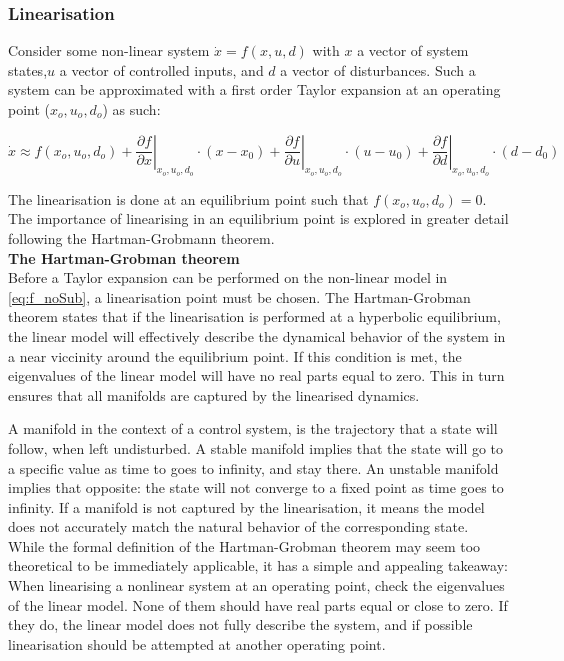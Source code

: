 \subsubsection{Linearisation} \label{sec:mod_linearisation}
Consider some non-linear system $\dot{x} = f(x,u,d)$ with $ x $ a vector of system states,$  u $ a vector of controlled inputs, and $ d $ a vector of disturbances. Such a system can be approximated with a first order Taylor expansion at an operating point ($x_o, u_o, d_o$) as such:

\begin{equation} \label{eq:taylor}
	\dot{x}   \approx   f(x_o, u_o, d_o)   +
	\left. \dfrac{\partial f}{\partial x} \right |_{x_o, u_o, d_o} \cdot (x-x_0) +
	\left. \dfrac{\partial f}{\partial u} \right |_{x_o, u_o, d_o} \cdot (u-u_0) +
	\left. \dfrac{\partial f}{\partial d} \right |_{x_o, u_o, d_o} \cdot (d-d_0)
\end{equation}

The linearisation is done at an equilibrium point such that $f(x_o, u_o, d_o) = 0$. The importance of linearising in an equilibrium point is explored in greater detail following the Hartman-Grobmann theorem.\\

\textbf{The Hartman-Grobman theorem}\\
Before a Taylor expansion can be performed on the non-linear model in \cref{eq:f_noSub}, a linearisation point must be chosen. The Hartman-Grobman theorem states that if the linearisation is performed at a hyperbolic equilibrium, the linear model will effectively describe the dynamical behavior of the system in a near viccinity around the equilibrium point. If this condition is met, the eigenvalues of the linear model will have no real parts equal to zero. This in turn ensures that all manifolds are captured by the linearised dynamics.

A manifold in the context of a control system, is the trajectory that a state will follow, when left undisturbed. A stable manifold implies that the state will go to a specific value as time to goes to infinity, and stay there. An unstable manifold implies that opposite: the state will not converge to a fixed point as time goes to infinity. If a manifold is not captured by the linearisation, it means the model does not accurately match the natural behavior of the corresponding state.\\

While the formal definition of the Hartman-Grobman theorem may seem too theoretical to be immediately applicable, it has a simple and appealing takeaway: When linearising a nonlinear system at an operating point, check the eigenvalues of the linear model. None of them should have real parts equal or close to zero. If they do, the linear model does not fully describe the system, and if possible linearisation should be attempted at another operating point.\\

